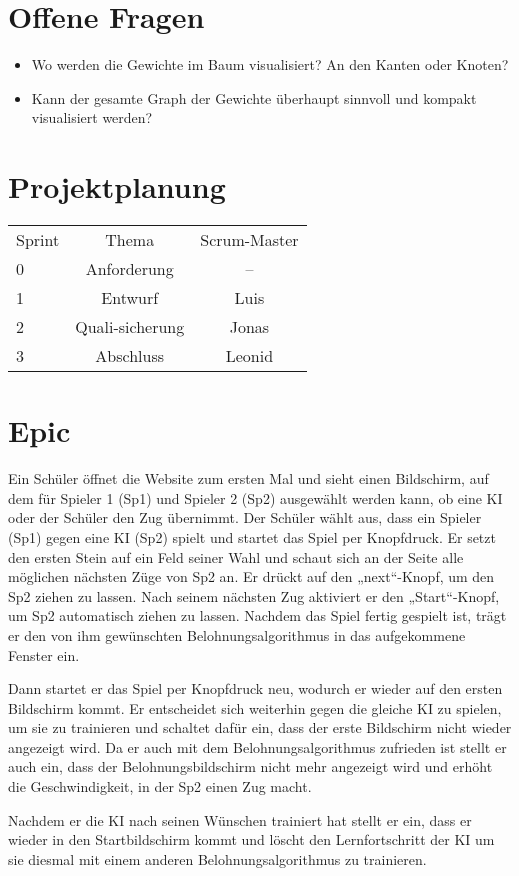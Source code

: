 \documentclass[titlepage]{scrartcl}
\begin{document}
\section{Offene Fragen}
\begin{itemize}
	\item Wo werden die Gewichte im Baum visualisiert? An den Kanten oder Knoten?
	\item Kann der gesamte Graph der Gewichte überhaupt sinnvoll und kompakt visualisiert werden?
\end{itemize}


\section{Projektplanung}%
\begin{tabular}{lcc}
	Sprint &Thema& Scrum-Master\\
	0&Anforderung&--\\
	1&Entwurf & Luis\\
	2&Quali-sicherung & Jonas \\
	3&Abschluss & Leonid\\
\end{tabular}


\section{Epic}

Ein Schüler öffnet die Website zum ersten Mal und sieht einen Bildschirm, auf dem für Spieler 1 (Sp1) und Spieler 2 
(Sp2) ausgewählt werden kann, ob eine KI oder der Schüler den Zug übernimmt.
Der Schüler wählt aus, dass ein Spieler (Sp1) gegen eine KI (Sp2) spielt und startet das Spiel per Knopfdruck.
Er setzt den ersten Stein auf ein Feld seiner Wahl und schaut sich an der Seite alle möglichen nächsten Züge von Sp2 an. Er drückt auf den „next“-Knopf, um den Sp2 ziehen zu lassen.
Nach seinem nächsten Zug aktiviert er den „Start“-Knopf, um Sp2 automatisch ziehen zu lassen.
Nachdem das Spiel fertig gespielt ist, trägt er den von ihm gewünschten Belohnungsalgorithmus in das aufgekommene Fenster ein.

Dann startet er das Spiel per Knopfdruck neu, wodurch er wieder auf den ersten Bildschirm kommt.
Er entscheidet sich weiterhin gegen die gleiche KI zu spielen, um sie zu trainieren und schaltet dafür ein, dass der erste Bildschirm nicht wieder angezeigt wird.
Da er auch mit dem Belohnungsalgorithmus zufrieden ist stellt er auch ein, dass der Belohnungsbildschirm nicht mehr angezeigt wird und erhöht die Geschwindigkeit, in der Sp2 einen Zug macht.

Nachdem er die KI nach seinen Wünschen trainiert hat stellt er ein, dass er wieder in den Startbildschirm kommt und löscht den Lernfortschritt der KI um sie diesmal mit einem anderen Belohnungsalgorithmus zu trainieren.
\end{document}
